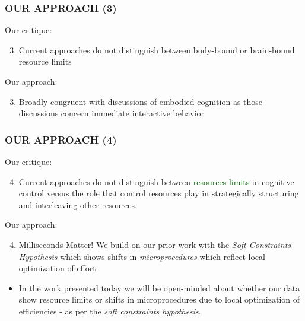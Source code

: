 \documentclass{beamer}
\begin{document}
\begin{frame}
	\frametitle{OUR APPROACH (3)}
Our critique:
	\begin{enumerate}
		\setcounter{enumi}{2}
		\item Current approaches do not distinguish between body-bound or brain-bound resource limits
	\end{enumerate}
\pause
Our approach: 
	\begin{enumerate}
		\setcounter{enumi}{2}
		\item Broadly congruent with discussions of embodied cognition \parencite{clark08,rupert10,km97} as those discussions concern immediate interactive behavior
	\end{enumerate}
\end{frame}

\begin{frame}
	\frametitle{OUR APPROACH (4)}
Our critique:
	\begin{enumerate}
		\setcounter{enumi}{3}
		\item Current approaches do not distinguish between \textcolor{darkgreen}{resources limits} in cognitive control versus the role that \textcolor{wdgRed}{control resources play} in \textcolor{wdgRed}{strategically structuring and interleaving} other resources.
	\end{enumerate}
\pause
Our approach: 
	\begin{enumerate}
		\setcounter{enumi}{3}
		\item \alert{Milliseconds Matter!} We build on our prior work with the \emph{Soft Constraints Hypothesis} \parencite{gray06pr} which shows shifts in \emph{microprocedures} which reflect local optimization of effort
	\end{enumerate}
	\begin{itemize}
			\item In the work presented today we will be open-minded about whether our data show \alert{resource limits} or \alert{shifts in microprocedures} due to local optimization of efficiencies - as per the \emph{soft constraints hypothesis}.
		\end{itemize}

\end{frame}
\end{document}

